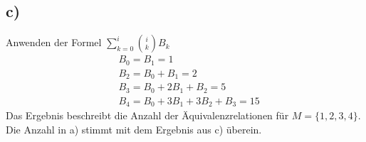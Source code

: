 \subsection*{c)}
Anwenden der Formel $\sum_{k=0}^{i}\binom{i}{k}B_k$
\begin{align}
&B_0 = B_1 = 1 \\
&B_2 = B_0 + B_1 = 2 \\
&B_3 = B_0 + 2B_1 + B_2 = 5 \\
&B_4 = B_0 + 3B_1 + 3B_2 + B_3 = 15
\end{align}
Das Ergebnis beschreibt die Anzahl der Äquivalenzrelationen für $M=\{1,2,3,4\}$. Die Anzahl in a) stimmt mit dem Ergebnis aus c) überein.
